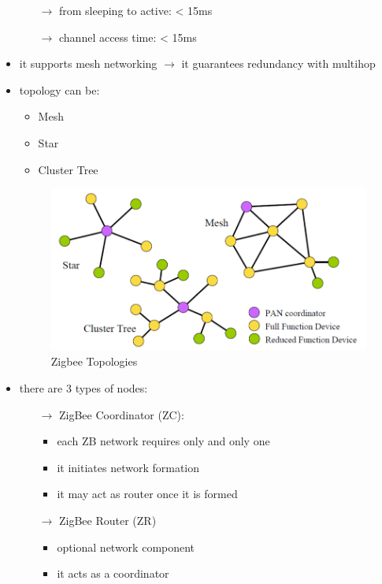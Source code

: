 \begin{itemize}
\begin{itemize}
        \item[$\rightarrow$] from sleeping to active: < 15ms
        \item[$\rightarrow$] channel access time: < 15ms  
    \end{itemize}
    \item it supports mesh networking $\rightarrow$ it guarantees redundancy with multihop
    \item topology can be:
    \begin{itemize}
        \item Mesh
        \item Star
        \item Cluster Tree
    \end{itemize}
    \begin{figure}[!h] 
        \centering 
        \includegraphics[scale = 0.4]{images/zigbee-topology.png} 
        \caption{Zigbee Topologies}
        \label{zigbee-topology}
    \end{figure}
    \item there are 3 types of nodes:
    \begin{itemize}
        \item[$\rightarrow$] ZigBee Coordinator (ZC):
        \begin{itemize}
            \item each ZB network requires only and only one
            \item it initiates network formation
            \item it may act as router once it is formed
        \end{itemize}
        \newpage
        \item[$\rightarrow$] ZigBee Router (ZR)
        \begin{itemize}
            \item optional network component
            \item it acts as a coordinator

\end{itemize}
\end{itemize}
\end{itemize}
